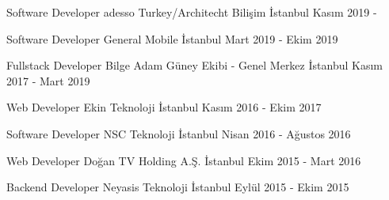 
\begin{cventries}

\cventry
{Software Developer}
{adesso Turkey/Architecht Bilişim}
{İstanbul}
{Kasım 2019 - }
{}

\cventry
{Software Developer}
{General Mobile}
{İstanbul}
{Mart 2019 - Ekim 2019}
{}

\cventry
{Fullstack Developer}
{Bilge Adam Güney Ekibi - Genel Merkez}
{İstanbul}
{Kasım 2017 - Mart 2019}
{}

\cventry
{Web Developer}
{Ekin Teknoloji}
{İstanbul}
{Kasım 2016 - Ekim 2017}
{}

\cventry
{Software Developer}
{NSC Teknoloji}
{İstanbul}
{Nisan 2016 - Ağustos 2016}
{}

\cventry
{Web Developer}
{Doğan TV Holding A.Ş.}
{İstanbul}
{Ekim 2015 - Mart 2016}{}

\cventry
{Backend Developer}
{Neyasis Teknoloji}
{İstanbul}
{Eylül 2015 - Ekim 2015}
{}

\end{cventries}
